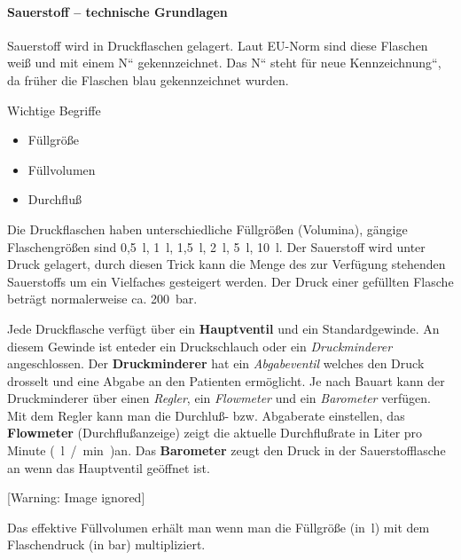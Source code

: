 \documentclass{article}
\newcommand\gT[1]{\textbf{\textup{\textcolor[rgb]{0.0,0.5019608,0.0}{#1}}}}
\newcommand\gE[1]{\textit{#1}}
\newcommand\gTt[1]{#1}
\begin{document}
\paragraph{Sauerstoff -- technische Grundlagen}
{\mdseries
Sauerstoff wird in Druckflaschen  gelagert. Laut EU-Norm sind diese
Flaschen wei{\ss} und mit einem
{\quotedblbase}\gTt{N}{\textquotedblleft} gekennzeichnet.
Das {\quotedblbase}\gTt{N}{\textquotedblleft} steht f\"ur
{\quotedblbase}neue Kennzeichnung{\textquotedblleft}, da fr\"uher die
Flaschen blau gekennzeichnet wurden. }

{\mdseries
Wichtige Begriffe}

\begin{itemize}
\item {\mdseries
F\"ullgr\"o{\ss}e }

\item {\mdseries
F\"ullvolumen }

\item {\mdseries
Durchflu{\ss} }

\end{itemize}
{\mdseries
Die Druckflaschen haben unterschiedliche F\"ullgr\"o{\ss}en (Volumina),
g\"angige Flaschengr\"o{\ss}en sind 0,5~l, 1~l, 1,5~l, 2~l, 5~l, 10~l.
Der Sauerstoff wird unter Druck gelagert, durch diesen Trick kann die
Menge des zur Verf\"ugung stehenden Sauerstoffs um ein Vielfaches
gesteigert werden. Der Druck einer gef\"ullten Flasche betr\"agt
normalerweise ca. 200~bar. }

{\mdseries
Jede Druckflasche verf\"ugt \"uber ein \gT{Hauptventil}
und ein Standardgewinde. An diesem Gewinde ist enteder ein
Druckschlauch oder ein \gE{Druckminderer} angeschlossen.
Der  \gT{Druckminderer} hat ein
\gE{Abgabeventil} welches den Druck drosselt und eine
Abgabe an den Patienten erm\"oglicht. Je nach Bauart kann der
Druckminderer \"uber einen \gE{Regler}, ein
\gE{Flowmeter} und ein \gE{Barometer}
verf\"ugen. Mit dem Regler kann man die Durchlu{\ss}- bzw. Abgaberate
ein\-stellen, das \gT{Flowmeter} (Durchflu{\ss}anzeige)
zeigt die aktuelle Durchflu{\ss}rate in Liter pro Minute (~l~/~min~)an.
Das \gT{Barometer} zeugt den Druck in der
Sauerstofflasche an wenn das Haupt\-ventil ge\"offnet ist. }

\begin{center}
 [Warning: Image ignored] %

\end{center}
{\mdseries
Das effektive F\"ullvolumen erh\"alt man wenn man die F\"ullgr\"o{\ss}e
(in~l) mit dem Flaschendruck (in bar) multipliziert.  }
\end{document}

